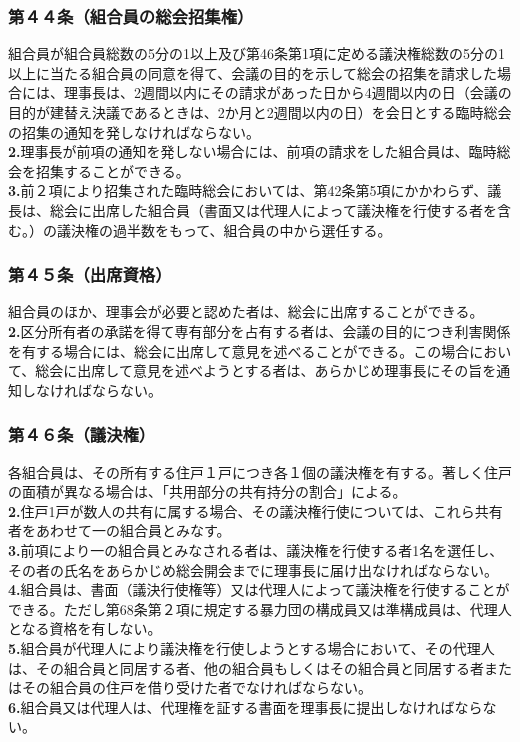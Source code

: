 \documentclass[12pt,uplatex]{jsarticle}
\begin{document}
\subsubsection*{第４４条（組合員の総会招集権）}
組合員が組合員総数の5分の1以上及び第46条第1項に定める議決権総数の5分の1以上に当たる組合員の同意を得て、会議の目的を示して総会の招集を請求した場合には、理事長は、2週間以内にその請求があった日から4週間以内の日（会議の目的が建替え決議であるときは、2か月と2週間以内の日）を会日とする臨時総会の招集の通知を発しなければならない。\\
\textbf{2.}理事長が前項の通知を発しない場合には、前項の請求をした組合員は、臨時総会を招集することができる。\\
\textbf{3.}前２項により招集された臨時総会においては、第42条第5項にかかわらず、議長は、総会に出席した組合員（書面又は代理人によって議決権を行使する者を含む。）の議決権の過半数をもって、組合員の中から選任する。
\subsubsection*{第４５条（出席資格）}
組合員のほか、理事会が必要と認めた者は、総会に出席することができる。\\
\textbf{2.}区分所有者の承諾を得て専有部分を占有する者は、会議の目的につき利害関係を有する場合には、総会に出席して意見を述べることができる。この場合において、総会に出席して意見を述べようとする者は、あらかじめ理事長にその旨を通知しなければならない。
\subsubsection*{第４６条（議決権）}
各組合員は、その所有する住戸１戸につき各１個の議決権を有する。著しく住戸の面積が異なる場合は、「共用部分の共有持分の割合」による。\\
\textbf{2.}住戸1戸が数人の共有に属する場合、その議決権行使については、これら共有者をあわせて一の組合員とみなす。\\
\textbf{3.}前項により一の組合員とみなされる者は、議決権を行使する者1名を選任し、その者の氏名をあらかじめ総会開会までに理事長に届け出なければならない。\\
\textbf{4.}組合員は、書面（議決行使権等）又は代理人によって議決権を行使することができる。ただし第68条第２項に規定する暴力団の構成員又は準構成員は、代理人となる資格を有しない。\\
\textbf{5.}組合員が代理人により議決権を行使しようとする場合において、その代理人は、その組合員と同居する者、他の組合員もしくはその組合員と同居する者またはその組合員の住戸を借り受けた者でなければならない。\\
\textbf{6.}組合員又は代理人は、代理権を証する書面を理事長に提出しなければならない。
\end{document}

